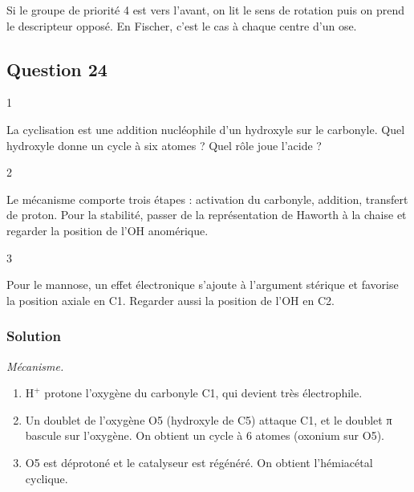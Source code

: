\documentclass[11pt,a4paper]{article}
\providecommand{\tightlist}{\setlength{\itemsep}{0pt}\setlength{\parskip}{0pt}}
\newcommand{\equationajustee}[1]{%
  \sbox{\boiteequation}{$\displaystyle #1$}%
  \ifdim\wd\boiteequation>\linewidth
    \[\resizebox{\linewidth}{!}{\usebox{\boiteequation}}\]%
  \else
    \[#1\]%
  \fi}
\begin{document}
\equationajustee{\boxed{\mathrm{C2}:(S),\quad\mathrm{C5}:(R)}\qquad\text{D-mannose}=(2S,3S,4R,5R)}

\begin{methode}

Si le groupe de priorité 4 est vers l'avant, on lit le sens de rotation puis on prend le descripteur opposé. En Fischer, c'est le cas à chaque centre d'un ose.

\end{methode}

\hypertarget{question-24}{%
\subsection{Question 24}\label{question-24}}

\begin{indication}{1}

La cyclisation est une addition nucléophile d'un hydroxyle sur le carbonyle. Quel hydroxyle donne un cycle à six atomes ? Quel rôle joue l'acide ?

\end{indication}

\begin{indication}{2}

Le mécanisme comporte trois étapes : activation du carbonyle, addition, transfert de proton. Pour la stabilité, passer de la représentation de Haworth à la chaise et regarder la position de l'OH anomérique.

\end{indication}

\begin{indication}{3}

Pour le mannose, un effet électronique s'ajoute à l'argument stérique et favorise la position axiale en C1. Regarder aussi la position de l'OH en C2.

\end{indication}

\hypertarget{solution-23}{%
\subsubsection{Solution}\label{solution-23}}

\emph{Mécanisme.}

\begin{enumerate}
\def\labelenumi{\arabic{enumi}.}
\tightlist
\item
  \(\mathrm{H^+}\) protone l'oxygène du carbonyle C1, qui devient très électrophile.
\item
  Un doublet de l'oxygène O5 (hydroxyle de C5) attaque C1, et le doublet π bascule sur l'oxygène. On obtient un cycle à 6 atomes (oxonium sur O5).
\item
  O5 est déprotoné et le catalyseur est régénéré. On obtient l'hémiacétal cyclique.
\end{enumerate}
\end{document}

